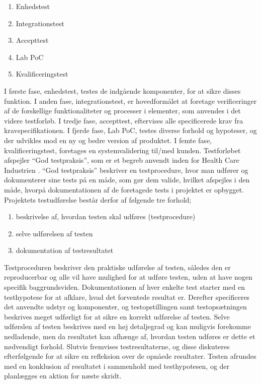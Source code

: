 	\begin{enumerate}
		\item Enhedstest
		\item Integrationstest
		\item Accepttest
		\item Lab PoC
		\item Kvalificeringstest 
	\end{enumerate}

I første fase, enhedstest, testes de indgående komponenter, for at sikre disses funktion. I anden fase, integrationstest, er hovedformålet at foretage verificeringer af de forskellige funktionaliteter og processer i elementer, som anvendes i det videre testforløb. I tredje fase, accepttest, eftervises alle specificerede krav fra kravspecifikationen. I fjerde fase, Lab PoC, testes diverse forhold og hypoteser, og der udvikles mod en ny og bedre version af produktet. I femte fase, kvalificeringstest, foretages en systemvalidering til/med kunden. Testforløbet afspejler “God testpraksis”, som er et begreb anvendt inden for Health Care Industrien \citep{RefWorks:2}. “God testpraksis” beskriver en testprocedure, hvor man udfører og dokumenterer sine tests på en måde, som gør dem valide, hvilket afspejles i den måde, hvorpå dokumentationen af de foretagede tests i projektet er opbygget. Projektets testudførelse består derfor af følgende tre forhold;

	\begin{enumerate}
	\item beskrivelse af, hvordan testen skal udføres (testprocedure) 
	\item selve udførelsen af testen 
	\item dokumentation af testresultatet
	\end{enumerate} 

Testproceduren beskriver den praktiske udførelse af testen, således den er reproducerbar og alle vil have mulighed for at udføre testen, uden at have nogen specifik baggrundsviden. Dokumentationen af hver enkelte test starter med en testhypotese for at afklare, hvad det forventede resultat er. Derefter specificeres det anvendte udstyr og komponenter, og testopstillingen samt testopsætningen beskrives meget udførligt for at sikre en korrekt udførelse af testen. Selve udførslen af testen beskrives med en høj detaljegrad og kan muligvis forekomme nedladende, men da resultatet kan afhænge af, hvordan testen udføres er dette et nødvendigt forhold. Slutvis fremvises testresultaterne, og disse diskuteres efterfølgende for at sikre en refleksion over de opnåede resultater. Testen afrundes med en konklusion af resultatet i sammenhold med testhypotesen, og der planlægges en aktion for næste skridt. 

